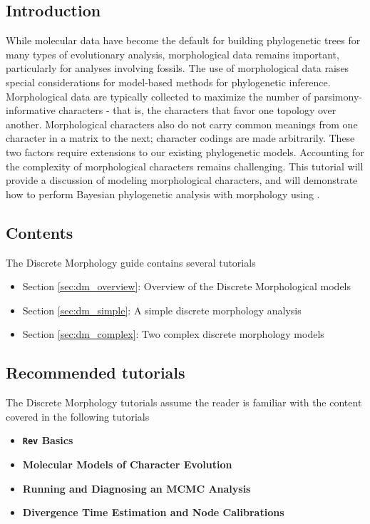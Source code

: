 \subsection*{Introduction}

While molecular data have become the default for building phylogenetic trees for many types of evolutionary analysis, morphological data remains important, particularly for analyses involving fossils. The use of morphological data  raises special considerations for model-based methods for phylogenetic inference. Morphological data are typically collected to maximize the number of parsimony-informative characters -  that is, the characters that favor one topology over another.  Morphological characters also do not carry common meanings from one character in a matrix to the next; character codings are made arbitrarily. These two factors require extensions to our existing phylogenetic models. Accounting for the complexity of morphological characters remains challenging. This tutorial will provide a discussion of modeling morphological characters, and will demonstrate how to perform Bayesian phylogenetic analysis with morphology using . 

\subsection*{Contents}

The Discrete Morphology guide contains several tutorials

\begin{itemize}
\item Section \ref{sec:dm_overview}: Overview of the Discrete Morphological models
\item Section \ref{sec:dm_simple}: A simple discrete morphology analysis
\item Section \ref{sec:dm_complex}: Two complex discrete morphology models
\end{itemize}

\subsection*{Recommended tutorials}

The Discrete Morphology tutorials assume the reader is familiar with the content covered in the following \RevBayes tutorials

\begin{itemize}
\item {\bf {\tt \large Rev} Basics}
\item {\bf Molecular Models of Character Evolution}
\item {\bf Running and Diagnosing an MCMC Analysis}
\item {\bf Divergence Time Estimation and Node Calibrations}
\end{itemize}

\newpage
